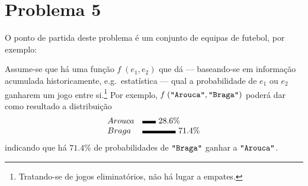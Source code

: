 \documentclass[a4paper]{article}
\newcommand{\Conid}[1]{\mathit{#1}}
\newcommand{\Varid}[1]{\mathit{#1}}
\def\resethooks{%
  \global\let\SaveRestoreHook\empty
  \global\let\ColumnHook\empty}
\newcommand{\hsindent}[1]{\quad}%
\let\hspre\empty
\let\hspost\empty
\begin{document}
\section*{Problema 5}
O ponto de partida deste problema é um conjunto de equipas de futebol, por exemplo:
\resethooks
Assume-se que há uma função \ensuremath{\Varid{f}\;(e_1 ,e_2 )} que dá --- baseando-se em informação
acumulada historicamente, e.g.\ estatística --- qual a probabilidade de \ensuremath{e_1 }
ou \ensuremath{e_2 } ganharem um jogo entre si.\footnote{Tratando-se de jogos eliminatórios,
não há lugar a empates.} Por exemplo, \ensuremath{\Varid{f}\;(\text{\tt \char34 Arouca\char34},\text{\tt \char34 Braga\char34})} poderá dar como
resultado a distribuição
\[
\begin{array}{ll}
Arouca & \rule{05.72mm}{3pt}\ 28.6\%\\
Braga  & \rule{14.20mm}{3pt}\ 71.4\%
\end{array}
\]
indicando que há \ensuremath{\mathrm{71.4}\mathbin{\%}} de probabilidades de \ensuremath{\text{\tt \char34 Braga\char34}} ganhar a \ensuremath{\text{\tt \char34 Arouca\char34}}.
\end{document}
